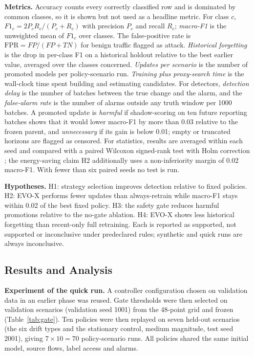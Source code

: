 \documentclass{article}
\begin{document}
\textbf{Metrics.} Accuracy counts every correctly classified row and is dominated by common classes, so it is shown but not used as a headline metric. For class $c$, $F1_c=2P_cR_c/(P_c+R_c)$ with precision $P_c$ and recall $R_c$; \emph{macro-F1} is the unweighted mean of $F1_c$ over classes. The false-positive rate is $\text{FPR}=FP/(FP+TN)$ for benign traffic flagged as attack. \emph{Historical forgetting} is the drop in per-class F1 on a historical holdout relative to the best earlier value, averaged over the classes concerned. \emph{Updates per scenario} is the number of promoted models per policy-scenario run. \emph{Training plus proxy-search time} is the wall-clock time spent building and estimating candidates. For detectors, \emph{detection delay} is the number of batches between the true change and the alarm, and the \emph{false-alarm rate} is the number of alarms outside any truth window per 1000 batches. A promoted update is \emph{harmful} if shadow-scoring on ten future reporting batches shows that it would lower macro-F1 by more than 0.03 relative to the frozen parent, and \emph{unnecessary} if its gain is below 0.01; empty or truncated horizons are flagged as censored. For statistics, results are averaged within each seed and compared with a paired Wilcoxon signed-rank test \cite{wilcoxon1945} with Holm correction \cite{holm1979}; the energy-saving claim H2 additionally uses a non-inferiority margin of 0.02 macro-F1. With fewer than six paired seeds no test is run.

\textbf{Hypotheses.} H1: strategy selection improves detection relative to fixed policies. H2: EVO-X performs fewer updates than always-retrain while macro-F1 stays within 0.02 of the best fixed policy. H3: the safety gate reduces harmful promotions relative to the no-gate ablation. H4: EVO-X shows less historical forgetting than recent-only full retraining. Each is reported as supported, not supported or inconclusive under predeclared rules; synthetic and quick runs are always inconclusive.

	\subsection{Results and Analysis}

\textbf{Experiment of the quick run.} A controller configuration chosen on validation data in an earlier phase was reused. Gate thresholds were then selected on validation scenarios (validation seed 1001) from the 48-point grid and frozen (Table~\ref{tab:gate}). Ten policies were then replayed on seven held-out scenarios (the six drift types and the stationary control, medium magnitude, test seed 2001), giving $7\times10=70$ policy-scenario runs. All policies shared the same initial model, source flows, label access and alarms.
\end{document}
